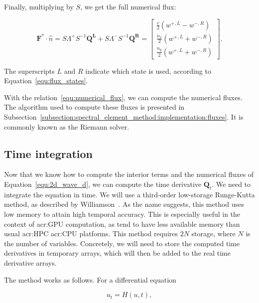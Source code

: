 \noindent
Finally, multiplying by \(S\), we get the full numerical flux:

\begin{equation} \label{equ:numerical_flux}
    \mathbf{F}^* \cdot \widehat{n} = 
    S \Lambda^+ S^{-1} \mathbf{\mathbf{Q}^L} + S \Lambda^- S^{-1} \mathbf{\mathbf{Q}^R} =
    \begin{bmatrix}
        \frac{c}{2} \left( w^{+, L} - w^{-, R} \right) \\
        \frac{n_x}{2} \left( w^{+, L} + w^{-, R} \right) \\
        \frac{n_y}{2} \left( w^{+, L} + w^{-, R} \right)
    \end{bmatrix}.
\end{equation}

\noindent
The superscripts \(L\) and \(R\) indicate which state is used, according to
Equation~\ref{equ:flux_states}. 

With the relation~\ref{equ:numerical_flux}, we can compute the numerical fluxes. The algorithm used
to compute these fluxes is presented in
Subsection~\ref{subsection:spectral_element_method:implementation:fluxes}. It is commonly known as
the Riemann solver.

\subsection{Time integration}\label{subsection:spectral_element_method:dg_sem:time}

Now that we know how to compute the interior terms and the numerical fluxes of
Equation~\ref{equ:2d_wave_d}, we can compute the time derivative \(\mathbf{Q}_t\). We need to
integrate the equation in time. We will use a third-order low-storage Runge-Kutta method, as
described by Williamson~\cite{Williamson1980}. As the name suggests, this method uses low memory to
attain high temporal accuracy. This is especially useful in the context of \acrshort{acr:GPU}
computation, as  tend to have less available memory than usual
\acrshort{acr:HPC} \acrshort{acr:CPU} platforms. This method requires \(2 N\) storage, where \(N\)
is the number of variables. Concretely, we will need to store the computed time derivatives in
temporary arrays, which will then be added to the real time derivative arrays.

The method works as follows. For a differential equation

\begin{equation}
    u_t = H(u, t),
\end{equation}

